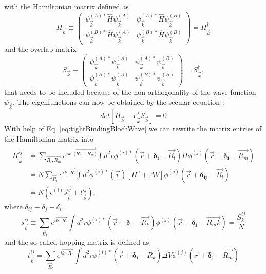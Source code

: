 		with the Hamiltonian matrix defined as
		\begin{equation}
			H_\vec k \equiv 
			\begin{pmatrix}
				\psi_\vec k^{(A)*} \hat H \psi_\vec k^{(A)} & \psi_\vec k^{(A)*} \hat H \psi_\vec k^{(B)} \\
				\psi_\vec k^{(B)*} \hat H \psi_\vec k^{(A)} & \psi_\vec k^{(B)*} \hat H \psi_\vec k^{(B)}
			\end{pmatrix}
			= H_\vec k^\dagger
		\end{equation}
		and the overlap matrix
		\begin{equation}	  
			S_\vec k \equiv 
			\begin{pmatrix}
				\psi_\vec k^{(A)*} \psi_\vec k^{(A)} & \psi_\vec k^{(A)*} \psi_\vec k^{(B)} \\
				\psi_\vec k^{(B)*} \psi_\vec k^{(A)} & \psi_\vec k^{(B)*} \psi_\vec k^{(B)}
			\end{pmatrix}
			= S_\vec k^\dagger,
		\end{equation}
		that needs to be included because of the non orthogonality of the wave function $\psi_\vec k$. The eigenfunctions can now be obtained by the secular equation :
		\begin{equation}
			det[H_\vec k - \epsilon_\vec k^\lambda S_\vec k] = 0
		\end{equation}
		With help of Eq. \ref{eq:tightBindingBlochWave} we can rewrite the matrix entries of the Hamiltonian matrix into
		\begin{align}
			\label{eq:tightHij}
			H_\vec k^{ij} &= \sum_{\vec{R_l, R_m}} e^{i \vec{k \cdot (\vec{R_l - R_m)}}} \int d^2 r \phi^{(i)*}(\vec{r } + \boldsymbol{\delta_i} - \vec{R_l}) H \phi^{(j)}(\vec{r} + \boldsymbol{\delta_i} - \vec{R_m}) \\
			&= N \sum_{\vec R_l} e^{i \vec{k \cdot R_l}} \int d^2 \phi^{(i)*}(\vec r)[H^a + \Delta V] \phi^{(j)}(\vec{r} + \boldsymbol{\delta_{ij}} - \vec{R_l}) \\
			&= N (\epsilon^{(i)} s_\vec k^{ij} + t_\vec k^{ij}),
		\end{align}
		where $\delta_{ij} \equiv \delta_j - \delta_i$,
		\begin{equation}
			\label{eq:tightSij}
			s_\vec k^{ij} \equiv \sum_{\vec R_l} e^{i \vec{k \cdot R_l}} \int d^2 r \phi^{(i)*}(\vec{r} + \boldsymbol{\delta_i} - \vec{R_k}) \phi^{(j)}(\vec{r} + \boldsymbol{\delta_j} - \vec{R_mk}) = \frac{S_k^{ij}}{N}
		\end{equation}
		and the so called hopping matrix is defined as
		\begin{equation}
			t_\vec k^{ij} = \sum_{\vec R_l} e^{i \vec{k \cdot R_l}} \int d^2 r \phi^{(i)*}(\vec{r} + \boldsymbol{\delta_i} - \vec{R_k}) \Delta V \phi^{(j)}(\vec{r} + \boldsymbol{\delta_j} - \vec{R_m})
		\end{equation}
